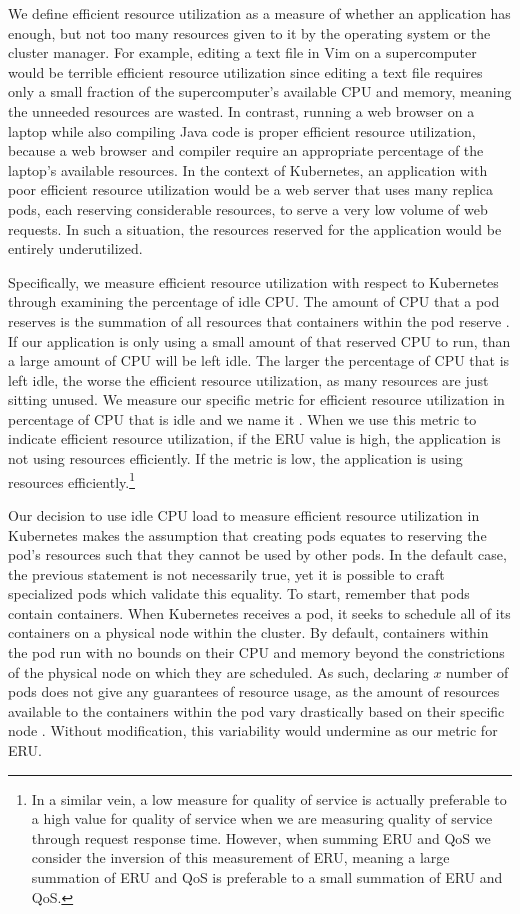 We define efficient resource utilization as a measure of whether an application
has enough, but not too many resources given to it by the operating system or
the cluster manager. For example, editing a text file in Vim on a supercomputer
would be terrible efficient resource utilization since editing a text file
requires only a small fraction of the supercomputer's available CPU and memory,
meaning the unneeded resources are wasted. In contrast, running a web browser on
a laptop while also compiling Java code is proper efficient
resource utilization, because a web browser and compiler require
an appropriate percentage of the laptop's available resources.
In the context of Kubernetes, an application with
poor efficient resource utilization would be a web server
that uses many replica pods, each reserving considerable resources,
to serve a very low volume of web requests. In such a situation, the resources
reserved for the application would be entirely underutilized.

Specifically, we measure efficient resource utilization with respect to
Kubernetes through examining the percentage of idle CPU.
The amount of CPU that a pod reserves is the summation of
all resources that containers within the pod reserve
\cite{k8s-compute-resources}. If our application is only using a small amount of
that reserved CPU to run, than a large amount of CPU will be left idle. The
larger the percentage of CPU that is left idle, the worse the efficient resource
utilization, as many resources are just sitting unused.
We measure our specific metric for efficient resource
utilization in percentage of CPU that is idle and we name it
. When we use this metric to indicate efficient resource utilization,
if the ERU value is high, the application is not using resources efficiently. If
the metric is low, the application is using resources efficiently.\footnote{In a
similar vein, a low measure for quality of service is actually preferable to a
high value for quality of service when we are measuring quality of service
through request response time. However, when summing ERU and QoS we consider
the inversion of this measurement of ERU, meaning a large summation of ERU and
QoS is preferable to a small summation of ERU and QoS.}

Our decision to use idle CPU load to measure efficient resource utilization
in Kubernetes makes the assumption that
creating pods equates to reserving the pod's resources such
that they cannot be used by other pods.
In the default case, the previous statement is not necessarily true,
yet it is possible to craft specialized pods which validate this equality. To
start, remember that pods contain containers. When Kubernetes receives a pod, it
seeks to schedule all of its containers on a physical node within the cluster.
By default, containers within the pod run with no bounds on their CPU and memory
beyond the constrictions of the physical node on which they are scheduled. As such,
declaring $x$ number of pods does not give any guarantees of resource usage, as
the amount of resources available to the containers within the pod vary
drastically based on their specific node \cite{k8s-limit-range}. Without
modification, this variability would undermine  as our metric for
ERU.

